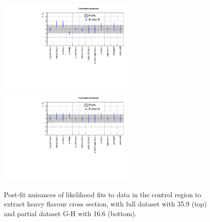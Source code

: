 \begin{figure}[h!]
  \centering
  \includegraphics[width=0.6\textwidth]{figures/ZPlusbb/TemplateFitv2_36invfb}
  \includegraphics[width=0.6\textwidth]{figures/ZPlusbb/TemplateFitv2_16invfb}
  \caption{\label{fig:btagsfge1b} Post-fit nuisances of likelihood
    fits to data in the \mmj control region to extract heavy flavour 
    cross section, with full dataset with 35.9 \ifb (top) and partial dataset 
    G-H with 16.6 \ifb (bottom).}
  \label{fig:zplusbb2}
\end{figure}

